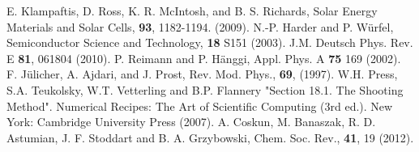 \documentclass[journal = mamobx, manuscript = article]{achemso}
\begin{document}
\begin{thebibliography}{99}
 E. Klampaftis, D. Ross, K. R.  McIntosh, and B. S. Richards, 
Solar Energy Materials and Solar Cells, {\bf 93}, 1182-1194. (2009).
 N.-P. Harder and P. W\"urfel, 
Semiconductor Science and Technology, {\bf 18} S151 (2003). 
 J.M. Deutsch Phys. Rev. E {\bf 81}, 061804 (2010). 
 P. Reimann and P. H\"anggi, Appl. Phys. A {\bf 75} 169 (2002).
 F. J\"ulicher, A. Ajdari, and J. Prost, Rev. Mod. Phys., {\bf 69}, (1997).
 W.H. Press, S.A. Teukolsky, W.T. Vetterling and B.P. Flannery "Section 18.1.
The Shooting Method". Numerical Recipes: The Art of Scientific Computing (3rd ed.). New York: Cambridge University Press (2007).
 A. Coskun, M. Banaszak, R. D. Astumian, J. F. Stoddart and B. A. Grzybowski, Chem. Soc. Rev., {\bf 41}, 19 (2012).
\end{thebibliography}{}
\end{document}
